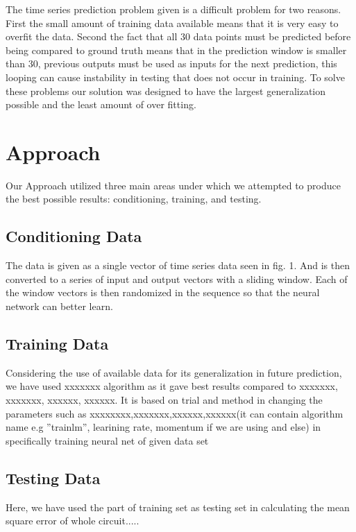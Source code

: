 \documentclass[conference]{IEEEtran}
\begin{document}
The time series prediction problem given is a difficult problem for two reasons. First the small amount of training data available means that it is very easy to overfit the data. Second the fact that all 30 data points must be predicted before being compared to ground truth means that in the prediction window is smaller than 30, previous outputs must be used as inputs for the next prediction, this looping can cause instability in testing that does not occur in training. To solve these problems our solution was designed to have the largest generalization possible and the least amount of over fitting.

\section{Approach}
Our Approach utilized three main areas under which we attempted to produce the best possible results: conditioning, training, and testing.

\subsection{Conditioning Data}
The data is given as a single vector of time series data seen in fig. 1. And is then converted to a series of input and output vectors with a sliding window. Each of the window vectors is then randomized in the sequence so that the neural network can better learn. 

\subsection{Training Data}
Considering the use of available data for its generalization in future prediction, we have used xxxxxxx algorithm as it gave best results compared to xxxxxxx, xxxxxxx, xxxxxx, xxxxxx. It is based on trial and method in  changing the parameters such as xxxxxxxx,xxxxxxx,xxxxxx,xxxxxx(it can contain algorithm name e.g ''trainlm'', learining rate, momentum if we are using and else) in specifically  training neural net of given data set

\subsection{Testing Data}

Here, we have used the part of training set as testing set in calculating the mean square error of whole circuit.....
\end{document}
